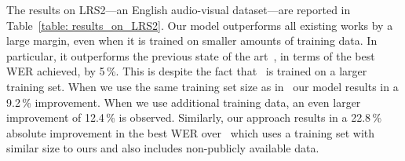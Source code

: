 \documentclass[twocolumn]{article}
\begin{document}
 The results on LRS2—an English audio-visual dataset—are reported in Table~\ref{table: results_on_LRS2}. Our model outperforms all existing works by a large margin, even when it is trained on smaller amounts of training data. In particular, it outperforms the previous state of the art~\cite{DBLP:journals/corr/abs-2102-06657}, in terms of the best WER achieved, by 5\,\%. This is despite the fact that~\cite{DBLP:journals/corr/abs-2102-06657} is trained on a larger training set. When we use the same training set size as in~\cite{DBLP:journals/corr/abs-2102-06657} our model results in a 9.2\,\% improvement. When we use additional training data, an even larger improvement of 12.4\,\% is observed. Similarly, our approach results in a 22.8\,\% absolute improvement in the best WER over~\cite{afouras2018deep} which uses a training set with similar size to ours and also includes non-publicly available data.
\end{document}

